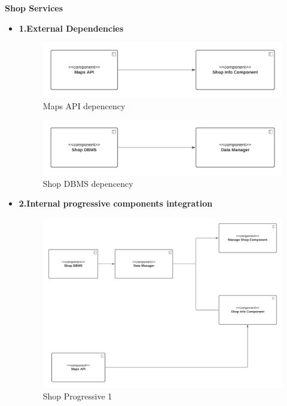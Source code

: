 \textbf{Shop Services}
\begin{itemize}
    \item \textbf{1.External Dependencies}
    \begin{figure}[h!]
        \centering
        \includegraphics[width=.8\textwidth]{Images/TestDiagram/Shop/maps.png}
        \caption{\label{fig:ShopExternalDepMAPS}{Maps API depencency}}
    \end{figure}
    \FloatBarrier  
    
    \begin{figure}[h!]
        \centering
        \includegraphics[width=.8\textwidth]{Images/TestDiagram/Shop/data.png}
        \caption{\label{fig:ShopExternalDepDBMS}{Shop DBMS depencency}}
    \end{figure}
    \FloatBarrier
    \item \textbf{2.Internal progressive components integration} 
    \begin{figure}[h!]
        \centering
        \includegraphics[width=1\textwidth]{Images/TestDiagram/Shop/2Shop(1).png}
        \caption{\label{fig:Shopinternal}{Shop Progressive 1}}
    \end{figure}
    \FloatBarrier  
\end{itemize}


